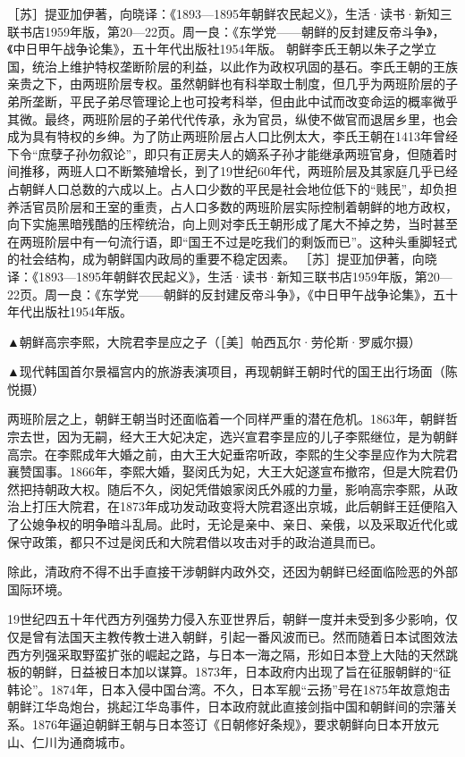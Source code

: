 \documentclass[12pt,UTF8]{ctexbook}
\begin{document}
［苏］提亚加伊著，向晓译：《1893—1895年朝鲜农民起义》，生活·读书·新知三联书店1959年版，第20—22页。周一良：《东学党——朝鲜的反封建反帝斗争》，《中日甲午战争论集》，五十年代出版社1954年版。
朝鲜李氏王朝以朱子之学立国，统治上维护特权垄断阶层的利益，以此作为政权巩固的基石。李氏王朝的王族亲贵之下，由两班阶层专权。虽然朝鲜也有科举取士制度，但几乎为两班阶层的子弟所垄断，平民子弟尽管理论上也可投考科举，但由此中试而改变命运的概率微乎其微。最终，两班阶层的子弟代代传承，永为官员，纵使不做官而退居乡里，也会成为具有特权的乡绅。为了防止两班阶层占人口比例太大，李氏王朝在1413年曾经下令“庶孽子孙勿叙论”，即只有正房夫人的嫡系子孙才能继承两班官身，但随着时间推移，两班人口不断繁殖增长，到了19世纪60年代，两班阶层及其家庭几乎已经占朝鲜人口总数的六成以上。占人口少数的平民是社会地位低下的“贱民”，却负担养活官员阶层和王室的重责，占人口多数的两班阶层实际控制着朝鲜的地方政权，向下实施黑暗残酷的压榨统治，向上则对李氏王朝形成了尾大不掉之势，当时甚至在两班阶层中有一句流行语，即“国王不过是吃我们的剩饭而已”。这种头重脚轻式的社会结构，成为朝鲜国内政局的重要不稳定因素。 ［苏］提亚加伊著，向晓译：《1893—1895年朝鲜农民起义》，生活·读书·新知三联书店1959年版，第20—22页。周一良：《东学党——朝鲜的反封建反帝斗争》，《中日甲午战争论集》，五十年代出版社1954年版。


▲朝鲜高宗李熙，大院君李昰应之子（［美］帕西瓦尔·劳伦斯·罗威尔摄）


▲现代韩国首尔景福宫内的旅游表演项目，再现朝鲜王朝时代的国王出行场面（陈悦摄）

两班阶层之上，朝鲜王朝当时还面临着一个同样严重的潜在危机。1863年，朝鲜哲宗去世，因为无嗣，经大王大妃决定，选兴宣君李昰应的儿子李熙继位，是为朝鲜高宗。在李熙成年大婚之前，由大王大妃垂帘听政，李熙的生父李昰应作为大院君襄赞国事。1866年，李熙大婚，娶闵氏为妃，大王大妃遂宣布撤帘，但是大院君仍然把持朝政大权。随后不久，闵妃凭借娘家闵氏外戚的力量，影响高宗李熙，从政治上打压大院君，在1873年成功发动政变将大院君逐出京城，此后朝鲜王廷便陷入了公媳争权的明争暗斗乱局。此时，无论是亲中、亲日、亲俄，以及采取近代化或保守政策，都只不过是闵氏和大院君借以攻击对手的政治道具而已。

除此，清政府不得不出手直接干涉朝鲜内政外交，还因为朝鲜已经面临险恶的外部国际环境。

19世纪四五十年代西方列强势力侵入东亚世界后，朝鲜一度并未受到多少影响，仅仅是曾有法国天主教传教士进入朝鲜，引起一番风波而已。然而随着日本试图效法西方列强采取野蛮扩张的崛起之路，与日本一海之隔，形如日本登上大陆的天然跳板的朝鲜，日益被日本加以谋算。1873年，日本政府内出现了旨在征服朝鲜的“征韩论”。1874年，日本入侵中国台湾。不久，日本军舰“云扬”号在1875年故意炮击朝鲜江华岛炮台，挑起江华岛事件，日本政府就此直接剑指中国和朝鲜间的宗藩关系。1876年逼迫朝鲜王朝与日本签订《日朝修好条规》，要求朝鲜向日本开放元山、仁川为通商城市。
\end{document}
